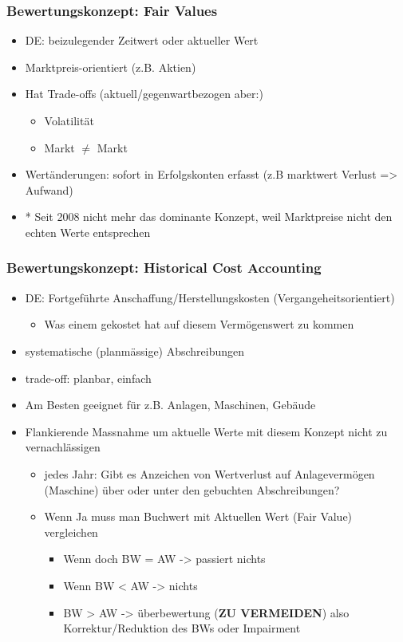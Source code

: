 \subsubsection{Bewertungskonzept: Fair Values}

\begin{itemize}
    \item DE: beizulegender Zeitwert oder aktueller Wert
    \item Marktpreis-orientiert (z.B. Aktien)
    \item Hat Trade-offs (aktuell/gegenwartbezogen aber:)
    \begin{itemize}
        \item Volatilität
        \item Markt $\ne$ Markt 
    \end{itemize}
    \item Wertänderungen: sofort in Erfolgskonten erfasst (z.B marktwert Verlust => Aufwand)
    \item * Seit 2008 nicht mehr das dominante Konzept, weil Marktpreise nicht den echten Werte entsprechen
\end{itemize}

\subsubsection{Bewertungskonzept: Historical Cost Accounting}
\begin{itemize}
    \item DE: Fortgeführte Anschaffung/Herstellungskosten (Vergangeheitsorientiert)
    \begin{itemize}
        \item Was einem gekostet hat auf diesem Vermögenswert zu kommen
    \end{itemize}
    \item systematische (planmässige) Abschreibungen
    \item trade-off: planbar, einfach
    \item Am Besten geeignet für z.B. Anlagen, Maschinen, Gebäude
    \item Flankierende Massnahme um aktuelle Werte mit diesem Konzept nicht zu vernachlässigen
    \begin{itemize}
        \item jedes Jahr: Gibt es Anzeichen von Wertverlust auf Anlagevermögen (Maschine) über oder unter den gebuchten Abschreibungen? 
        \item Wenn Ja muss man Buchwert mit Aktuellen Wert (Fair Value) vergleichen
        \begin{itemize}
            \item Wenn doch BW = AW -> passiert nichts
            \item Wenn BW < AW -> nichts
            \item BW > AW -> überbewertung (\textbf{ZU VERMEIDEN}) also Korrektur/Reduktion des BWs oder Impairment
        \end{itemize}
    \end{itemize}
\end{itemize}

